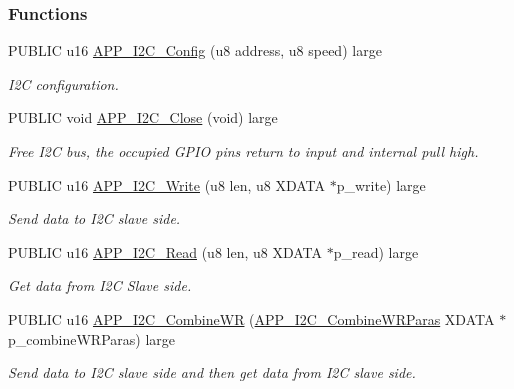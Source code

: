 \subsubsection*{Functions}
\begin{DoxyCompactItemize}
\item 
P\+U\+B\+L\+IC u16 \hyperlink{group___i2_c_ga90c9e55c3a8c331ef5b27243b02d5a80}{A\+P\+P\+\_\+\+I2\+C\+\_\+\+Config} (u8 address, u8 speed) large
\begin{DoxyCompactList}\small\item\em I2C configuration. \end{DoxyCompactList}\item 
P\+U\+B\+L\+IC void \hyperlink{group___i2_c_gacd42875c30230b785ce926891825ecab}{A\+P\+P\+\_\+\+I2\+C\+\_\+\+Close} (void) large\hypertarget{group___i2_c_gacd42875c30230b785ce926891825ecab}{}\label{group___i2_c_gacd42875c30230b785ce926891825ecab}

\begin{DoxyCompactList}\small\item\em Free I2C bus, the occupied G\+P\+IO pins return to input and internal pull high. \end{DoxyCompactList}\item 
P\+U\+B\+L\+IC u16 \hyperlink{group___i2_c_ga07c0f332850e2a2548e5789707f3036c}{A\+P\+P\+\_\+\+I2\+C\+\_\+\+Write} (u8 len, u8 X\+D\+A\+TA $\ast$p\+\_\+write) large
\begin{DoxyCompactList}\small\item\em Send data to I2C slave side. \end{DoxyCompactList}\item 
P\+U\+B\+L\+IC u16 \hyperlink{group___i2_c_gacebf2b81469bc11fdb65f62085f7347f}{A\+P\+P\+\_\+\+I2\+C\+\_\+\+Read} (u8 len, u8 X\+D\+A\+TA $\ast$p\+\_\+read) large
\begin{DoxyCompactList}\small\item\em Get data from I2C Slave side. \end{DoxyCompactList}\item 
P\+U\+B\+L\+IC u16 \hyperlink{group___i2_c_ga01dba2fc51cd940042bc0e620de80c8f}{A\+P\+P\+\_\+\+I2\+C\+\_\+\+Combine\+WR} (\hyperlink{struct_a_p_p___i2_c___combine_w_r_paras}{A\+P\+P\+\_\+\+I2\+C\+\_\+\+Combine\+W\+R\+Paras} X\+D\+A\+TA $\ast$p\+\_\+combine\+W\+R\+Paras) large
\begin{DoxyCompactList}\small\item\em Send data to I2C slave side and then get data from I2C slave side. \end{DoxyCompactList}\end{DoxyCompactItemize}



